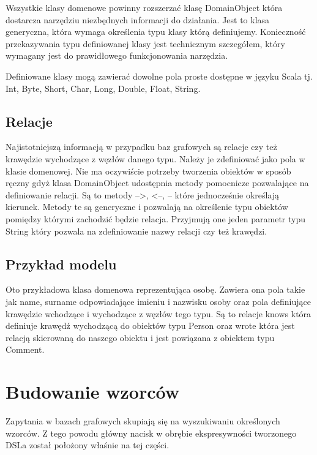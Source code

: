 \documentclass[brudnopis]{xmgr}
\begin{document}
Wszystkie klasy domenowe powinny rozszerzać klasę DomainObject która dostarcza narzędziu niezbędnych informacji do działania. Jest to klasa generyczna, która wymaga określenia typu klasy którą definiujemy. Konieczność przekazywania typu definiowanej klasy jest technicznym szczegółem, który wymagany jest do prawidłowego funkcjonowania narzędzia.

Definiowane klasy mogą zawierać dowolne pola proste dostępne w języku Scala tj. Int, Byte, Short, Char, Long, Double, Float, String.

\subsection{Relacje}

Najistotniejszą informacją w przypadku baz grafowych są relacje czy też krawędzie wychodzące z węzłów danego typu. Należy je zdefiniować jako pola w klasie domenowej. Nie ma oczywiście potrzeby tworzenia obiektów w sposób ręczny gdyż klasa DomainObject udostępnia metody pomocnicze pozwalające na definiowanie relacji. Są to metody  -->, <--, -- które jednocześnie określają kierunek. Metody te są generyczne i pozwalają na określenie typu obiektów pomiędzy którymi zachodzić będzie relacja. Przyjmują one jeden parametr typu String który pozwala na zdefiniowanie nazwy relacji czy też krawędzi.

\subsection{Przykład modelu}

Oto przykładowa klasa domenowa reprezentująca osobę. Zawiera ona pola takie jak name, surname odpowiadające imieniu i nazwisku osoby oraz pola definiujące krawędzie wchodzące i wychodzące z węzłów tego typu. Są to relacje knows która definiuje krawędź wychodzącą do obiektów typu Person oraz wrote która jest relacją skierowaną do naszego obiektu i jest powiązana z obiektem typu Comment.



\section{Budowanie wzorców}

Zapytania w bazach grafowych skupiają się na wyszukiwaniu określonych wzorców. Z tego powodu główny nacisk w obrębie ekspresywności tworzonego DSLa został położony właśnie na tej części.
\end{document}

